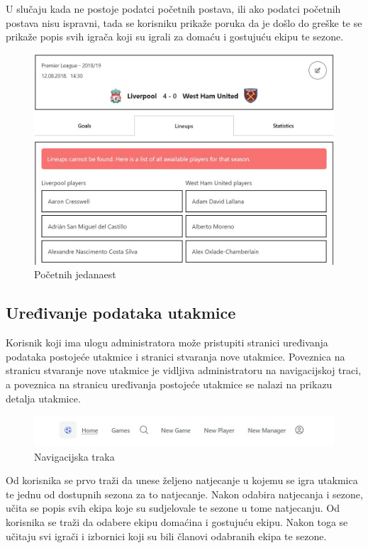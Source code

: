 \documentclass[times, utf8, zavrsni]{fer}
\begin{document}
U slučaju kada ne postoje podatci početnih postava, ili ako podatci početnih postava nisu ispravni, tada se korisniku prikaže poruka da je došlo do greške te se prikaže popis svih igrača koji su igrali za
domaću i gostujuću ekipu te sezone.

\begin{figure}[htb]
\centering
\includegraphics[width=14.2cm]{images/lineup-fallback.jpg}
\caption{Početnih jedanaest}
\label{fig:formation}
\end{figure}


\subsection{Uređivanje podataka utakmice}

Korisnik koji ima ulogu administratora može pristupiti stranici uređivanja podataka postojeće utakmice i stranici stvaranja nove utakmice.
Poveznica na stranicu stvaranje nove utakmice je vidljiva administratoru na navigacijskoj traci, a poveznica na stranicu uređivanja postojeće utakmice se nalazi na prikazu detalja utakmice.

\begin{figure}[htb]
\centering
\includegraphics[width=14cm]{images/navigation.jpg}
\caption{Navigacijska traka}
\label{fig:formation}
\end{figure}


Od korisnika se prvo traži da unese željeno natjecanje u kojemu se igra utakmica te jednu od dostupnih sezona za to natjecanje.
Nakon odabira natjecanja i sezone, učita se popis svih ekipa koje su sudjelovale te sezone u tome natjecanju.
Od korisnika se traži da odabere ekipu domaćina i gostujuću ekipu. Nakon toga se učitaju svi igrači i izbornici koji su bili članovi odabranih ekipa te sezone.
\end{document}
